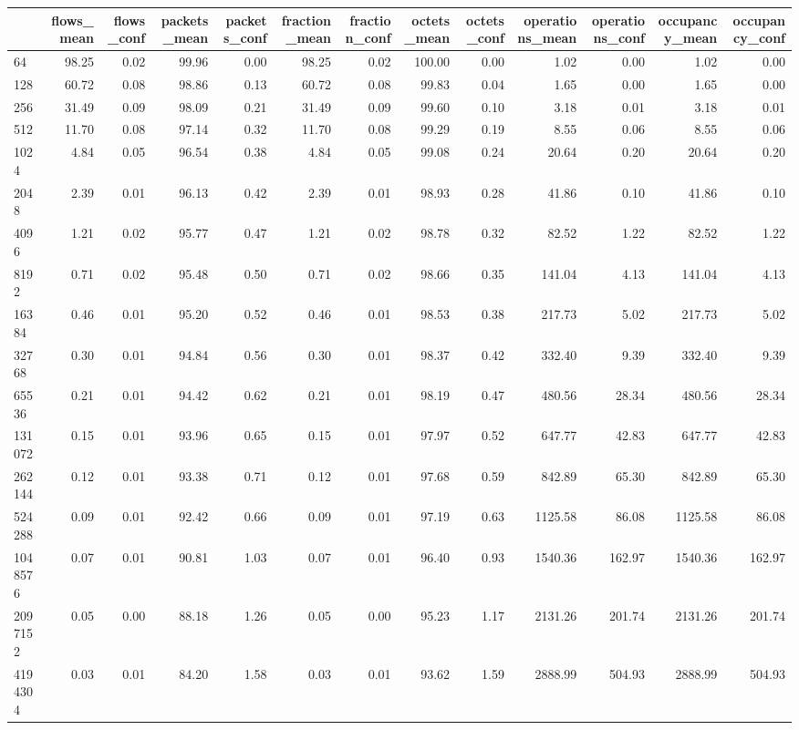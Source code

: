 \begin{tabular}{lrrrrrrrrrrrr}
\toprule
 & flows_mean & flows_conf & packets_mean & packets_conf & fraction_mean & fraction_conf & octets_mean & octets_conf & operations_mean & operations_conf & occupancy_mean & occupancy_conf \\
\midrule
64 & 98.25 & 0.02 & 99.96 & 0.00 & 98.25 & 0.02 & 100.00 & 0.00 & 1.02 & 0.00 & 1.02 & 0.00 \\
128 & 60.72 & 0.08 & 98.86 & 0.13 & 60.72 & 0.08 & 99.83 & 0.04 & 1.65 & 0.00 & 1.65 & 0.00 \\
256 & 31.49 & 0.09 & 98.09 & 0.21 & 31.49 & 0.09 & 99.60 & 0.10 & 3.18 & 0.01 & 3.18 & 0.01 \\
512 & 11.70 & 0.08 & 97.14 & 0.32 & 11.70 & 0.08 & 99.29 & 0.19 & 8.55 & 0.06 & 8.55 & 0.06 \\
1024 & 4.84 & 0.05 & 96.54 & 0.38 & 4.84 & 0.05 & 99.08 & 0.24 & 20.64 & 0.20 & 20.64 & 0.20 \\
2048 & 2.39 & 0.01 & 96.13 & 0.42 & 2.39 & 0.01 & 98.93 & 0.28 & 41.86 & 0.10 & 41.86 & 0.10 \\
4096 & 1.21 & 0.02 & 95.77 & 0.47 & 1.21 & 0.02 & 98.78 & 0.32 & 82.52 & 1.22 & 82.52 & 1.22 \\
8192 & 0.71 & 0.02 & 95.48 & 0.50 & 0.71 & 0.02 & 98.66 & 0.35 & 141.04 & 4.13 & 141.04 & 4.13 \\
16384 & 0.46 & 0.01 & 95.20 & 0.52 & 0.46 & 0.01 & 98.53 & 0.38 & 217.73 & 5.02 & 217.73 & 5.02 \\
32768 & 0.30 & 0.01 & 94.84 & 0.56 & 0.30 & 0.01 & 98.37 & 0.42 & 332.40 & 9.39 & 332.40 & 9.39 \\
65536 & 0.21 & 0.01 & 94.42 & 0.62 & 0.21 & 0.01 & 98.19 & 0.47 & 480.56 & 28.34 & 480.56 & 28.34 \\
131072 & 0.15 & 0.01 & 93.96 & 0.65 & 0.15 & 0.01 & 97.97 & 0.52 & 647.77 & 42.83 & 647.77 & 42.83 \\
262144 & 0.12 & 0.01 & 93.38 & 0.71 & 0.12 & 0.01 & 97.68 & 0.59 & 842.89 & 65.30 & 842.89 & 65.30 \\
524288 & 0.09 & 0.01 & 92.42 & 0.66 & 0.09 & 0.01 & 97.19 & 0.63 & 1125.58 & 86.08 & 1125.58 & 86.08 \\
1048576 & 0.07 & 0.01 & 90.81 & 1.03 & 0.07 & 0.01 & 96.40 & 0.93 & 1540.36 & 162.97 & 1540.36 & 162.97 \\
2097152 & 0.05 & 0.00 & 88.18 & 1.26 & 0.05 & 0.00 & 95.23 & 1.17 & 2131.26 & 201.74 & 2131.26 & 201.74 \\
4194304 & 0.03 & 0.01 & 84.20 & 1.58 & 0.03 & 0.01 & 93.62 & 1.59 & 2888.99 & 504.93 & 2888.99 & 504.93 \\

\end{tabular}

